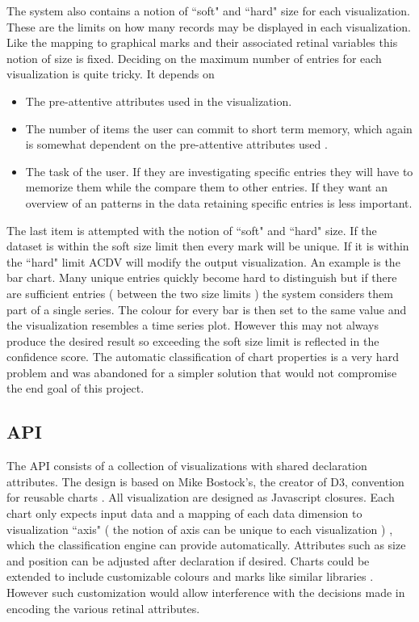 \documentclass[a4paper, 11pt, titlepage, onehalfspacing]{report}
\begin{document}
The system also contains a notion of ``soft" and ``hard" size for each visualization. These are the limits on how many records may be displayed in each visualization. Like the mapping to graphical marks and their associated retinal variables this notion of size is fixed. Deciding on the maximum number of entries for each visualization is quite tricky. It depends on 
\begin{itemize}
  \item The pre-attentive attributes used in the visualization. 
  \item The number of items the user can commit to short term memory, which again is somewhat dependent on the pre-attentive attributes used \cite{Mil56}.
  \item The task of the user. If they are investigating specific entries they will have to memorize them while the compare them to other entries. If they want an overview of an patterns in the data retaining specific entries is less important. 
\end{itemize}
The last item is attempted with the notion of ``soft" and ``hard" size. If the dataset is within the soft size limit then every mark will be unique. If it is within the ``hard" limit AC\lightning{}DV will modify the output visualization. An example is the bar chart. Many unique entries quickly become hard to distinguish but if there are sufficient entries ( between the two size limits ) the system considers them part of a single series. The colour for every bar is then set to the same value and the visualization resembles a time series plot. However this may not always produce the desired result so exceeding the soft size limit is reflected in the confidence score. The automatic classification of chart properties is a very hard problem and was abandoned for a simpler solution that would not compromise the end goal of this project. 


\subsection{API}
The API consists of a collection of visualizations with shared declaration attributes. The design is based on Mike Bostock's, the creator of D3, convention for reusable charts \cite{mikeconvention}. All visualization are designed as Javascript closures. Each chart only expects input data and a mapping of each data dimension to visualization ``axis" ( the notion of axis can be unique to each visualization ) , which the classification engine can provide automatically. Attributes such as size and position can be adjusted after declaration if desired. Charts could be extended to include customizable colours and marks like similar libraries \cite{dcjs}. However such customization would allow interference with the decisions made in encoding the various retinal attributes.  
\end{document}
